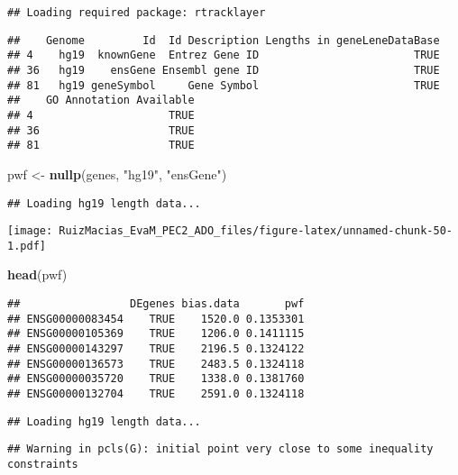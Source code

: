 \documentclass[
]{article}
\newenvironment{Shaded}{\begin{snugshade}}{\end{snugshade}}
\newcommand{\KeywordTok}[1]{\textcolor[rgb]{0.13,0.29,0.53}{\textbf{#1}}}
\newcommand{\NormalTok}[1]{#1}
\newcommand{\StringTok}[1]{\textcolor[rgb]{0.31,0.60,0.02}{#1}}
\begin{document}
\begin{verbatim}
## Loading required package: rtracklayer
\end{verbatim}

\begin{verbatim}
##    Genome         Id  Id Description Lengths in geneLeneDataBase
## 4    hg19  knownGene  Entrez Gene ID                        TRUE
## 36   hg19    ensGene Ensembl gene ID                        TRUE
## 81   hg19 geneSymbol     Gene Symbol                        TRUE
##    GO Annotation Available
## 4                     TRUE
## 36                    TRUE
## 81                    TRUE
\end{verbatim}

\begin{Shaded}
\begin{Highlighting}[]
\NormalTok{pwf <-}\StringTok{ }\KeywordTok{nullp}\NormalTok{(genes, }\StringTok{"hg19"}\NormalTok{, }\StringTok{"ensGene"}\NormalTok{)}
\end{Highlighting}
\end{Shaded}

\begin{verbatim}
## Loading hg19 length data...
\end{verbatim}

\texttt{[image: RuizMacias\_EvaM\_PEC2\_ADO\_files/figure-latex/unnamed-chunk-50-1.pdf]}

\begin{Shaded}
\begin{Highlighting}[]
\KeywordTok{head}\NormalTok{(pwf)}
\end{Highlighting}
\end{Shaded}

\begin{verbatim}
##                 DEgenes bias.data       pwf
## ENSG00000083454    TRUE    1520.0 0.1353301
## ENSG00000105369    TRUE    1206.0 0.1411115
## ENSG00000143297    TRUE    2196.5 0.1324122
## ENSG00000136573    TRUE    2483.5 0.1324118
## ENSG00000035720    TRUE    1338.0 0.1381760
## ENSG00000132704    TRUE    2591.0 0.1324118
\end{verbatim}

\begin{verbatim}
## Loading hg19 length data...
\end{verbatim}

\begin{verbatim}
## Warning in pcls(G): initial point very close to some inequality constraints
\end{verbatim}
\end{document}
